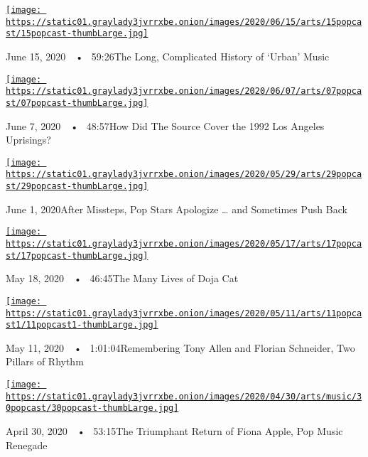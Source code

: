 \href{https://www.nytimes3xbfgragh.onion/2020/06/15/arts/music/popcast-urban-music.html?action=click\&module=audio-series-bar\&region=header\&pgtype=Article}{\texttt{[image: https://static01.graylady3jvrrxbe.onion/images/2020/06/15/arts/15popcast/15popcast-thumbLarge.jpg]}}

June 15, 2020~~•~ 59:26The Long, Complicated History of `Urban' Music

\href{https://www.nytimes3xbfgragh.onion/2020/06/07/arts/music/popcast-the-source-rodney-king.html?action=click\&module=audio-series-bar\&region=header\&pgtype=Article}{\texttt{[image: https://static01.graylady3jvrrxbe.onion/images/2020/06/07/arts/07popcast/07popcast-thumbLarge.jpg]}}

June 7, 2020~~•~ 48:57How Did The Source Cover the 1992 Los Angeles
Uprisings?

\href{https://www.nytimes3xbfgragh.onion/2020/06/01/arts/music/popcast-lana-del-rey-doja-cat-apologies.html?action=click\&module=audio-series-bar\&region=header\&pgtype=Article}{\texttt{[image: https://static01.graylady3jvrrxbe.onion/images/2020/05/29/arts/29popcast/29popcast-thumbLarge.jpg]}}

June 1, 2020After Missteps, Pop Stars Apologize \ldots{} and Sometimes
Push Back

\href{https://www.nytimes3xbfgragh.onion/2020/05/18/arts/music/popcast-doja-cat.html?action=click\&module=audio-series-bar\&region=header\&pgtype=Article}{\texttt{[image: https://static01.graylady3jvrrxbe.onion/images/2020/05/17/arts/17popcast/17popcast-thumbLarge.jpg]}}

May 18, 2020~~•~ 46:45The Many Lives of Doja Cat

\href{https://www.nytimes3xbfgragh.onion/2020/05/11/arts/music/popcast-tony-allen-florian-schneider.html?action=click\&module=audio-series-bar\&region=header\&pgtype=Article}{\texttt{[image: https://static01.graylady3jvrrxbe.onion/images/2020/05/11/arts/11popcast1/11popcast1-thumbLarge.jpg]}}

May 11, 2020~~•~ 1:01:04Remembering Tony Allen and Florian Schneider,
Two Pillars of Rhythm

\href{https://www.nytimes3xbfgragh.onion/2020/04/30/arts/music/popcast-fiona-apple.html?action=click\&module=audio-series-bar\&region=header\&pgtype=Article}{\texttt{[image: https://static01.graylady3jvrrxbe.onion/images/2020/04/30/arts/music/30popcast/30popcast-thumbLarge.jpg]}}

April 30, 2020~~•~ 53:15The Triumphant Return of Fiona Apple, Pop Music
Renegade

